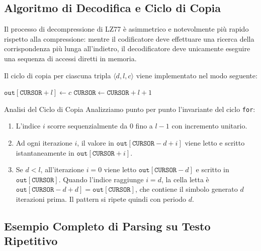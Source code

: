 \FloatBarrier
\subsection{Algoritmo di Decodifica e Ciclo di Copia}
\label{subsec:algoritmo-decodifica-overlap}

Il processo di decompressione di LZ77 \`e asimmetrico e notevolmente pi\`u rapido rispetto alla compressione: mentre il codificatore deve effettuare una ricerca della corrispondenza pi\`u lunga all'indietro, il decodificatore deve unicamente eseguire una sequenza di accessi diretti in memoria.

Il ciclo di copia per ciascuna tripla $\langle d, l, c \rangle$ viene implementato nel modo seguente:

\begin{algorithm}[H]
\caption{Decodifica della Tripla LZ77 con Gestione dell'Overlap}
\label{alg:lz77-decode}
\BlankLine
{}
$\texttt{out}[\texttt{CURSOR} + l] \leftarrow c$\;
$\texttt{CURSOR} \leftarrow \texttt{CURSOR} + l + 1$\;
\end{algorithm}

\begin{noteblock}{Analisi del Ciclo di Copia}
Analizziamo punto per punto l'invariante del ciclo \texttt{for}:
\begin{enumerate}
  \item L'indice $i$ scorre sequenzialmente da $0$ fino a $l - 1$ con incremento unitario.
  \item Ad ogni iterazione $i$, il valore in $\texttt{out}[\texttt{CURSOR} - d + i]$ viene letto e scritto istantaneamente in $\texttt{out}[\texttt{CURSOR} + i]$.
  \item Se $d < l$, all'iterazione $i = 0$ viene letto $\texttt{out}[\texttt{CURSOR} - d]$ e scritto in $\texttt{out}[\texttt{CURSOR}]$. Quando l'indice raggiunge $i = d$, la cella letta \`e $\texttt{out}[\texttt{CURSOR} - d + d] = \texttt{out}[\texttt{CURSOR}]$, che contiene il simbolo generato $d$ iterazioni prima. Il pattern si ripete quindi con periodo $d$.
\end{enumerate}
\end{noteblock}

\FloatBarrier
\subsection{Esempio Completo di Parsing su Testo Ripetitivo}
\label{subsec:esempio-completo-lz77}

